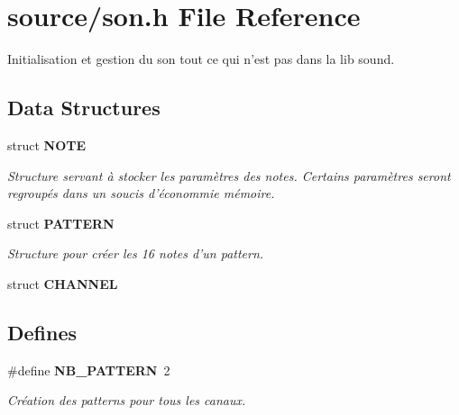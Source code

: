 \section{source/son.h File Reference}
\label{son_8h}


Initialisation et gestion du son tout ce qui n'est pas dans la lib sound.  


\subsection*{Data Structures}
\begin{DoxyCompactItemize}
\item 
struct {\bf NOTE}
\begin{DoxyCompactList}\small\item\em Structure servant à stocker les paramètres des notes. Certains paramètres seront regroupés dans un soucis d'économmie mémoire. \item\end{DoxyCompactList}\item 
struct {\bf PATTERN}
\begin{DoxyCompactList}\small\item\em Structure pour créer les 16 notes d'un pattern. \item\end{DoxyCompactList}\item 
struct {\bf CHANNEL}
\end{DoxyCompactItemize}
\subsection*{Defines}
\begin{DoxyCompactItemize}
\item 
\#define {\bf NB\_\-PATTERN}~2\label{son_8h_a4b89ee24c712fcd59eb930e513545a0d}

\begin{DoxyCompactList}\small\item\em Création des patterns pour tous les canaux. \item\end{DoxyCompactList}\end{DoxyCompactItemize}

